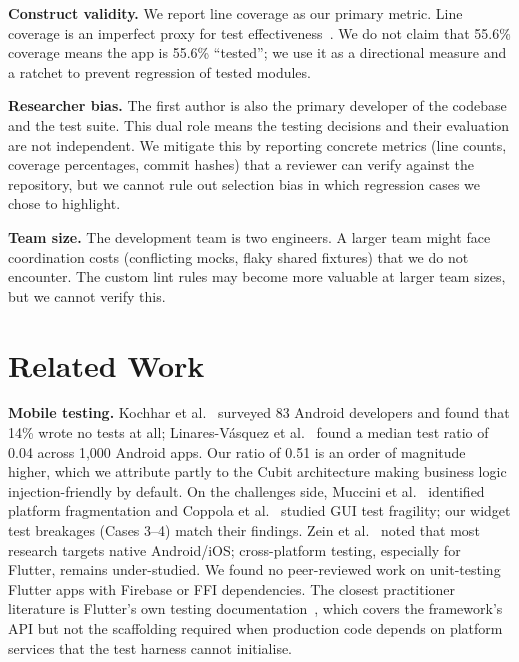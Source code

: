 \documentclass[10pt,journal,compsoc]{IEEEtran}
\begin{document}
\textbf{Construct validity.} We report line coverage as our primary
metric. Line coverage is an imperfect proxy for test
effectiveness~\cite{inozemtseva2014coverage,gopinath2014code}. We do not
claim that 55.6\% coverage means the app is 55.6\% ``tested''; we use it
as a directional measure and a ratchet to prevent regression of tested
modules.

\textbf{Researcher bias.} The first author is also the primary developer
of the codebase and the test suite. This dual role means the testing
decisions and their evaluation are not independent. We mitigate this by
reporting concrete metrics (line counts, coverage percentages, commit
hashes) that a reviewer can verify against the repository, but we cannot
rule out selection bias in which regression cases we chose to highlight.

\textbf{Team size.} The development team is two engineers. A larger team
might face coordination costs (conflicting mocks, flaky shared fixtures)
that we do not encounter. The custom lint rules may become more valuable
at larger team sizes, but we cannot verify this.


\section{Related Work}
\label{sec:related}

\textbf{Mobile testing.}
Kochhar et al.~\cite{kochhar2015understanding} surveyed 83 Android
developers and found that 14\% wrote no tests at all;
Linares-V\'{a}squez et al.~\cite{linares2017developers} found a median
test ratio of 0.04 across 1,000 Android apps. Our ratio of 0.51 is an
order of magnitude higher, which we attribute partly to the Cubit
architecture making business logic injection-friendly by default. On the
challenges side, Muccini et al.~\cite{muccini2012software} identified
platform fragmentation and Coppola et
al.~\cite{coppola2019mobile} studied GUI test fragility; our widget test
breakages (Cases 3--4) match their findings. Zein et
al.~\cite{zein2016systematic} noted that most research targets native
Android/iOS; cross-platform testing, especially for Flutter, remains
under-studied. We found no peer-reviewed work on unit-testing Flutter
apps with Firebase or FFI dependencies. The closest practitioner
literature is Flutter's own testing documentation~\cite{flutter_testing_docs},
which covers the framework's API but not the scaffolding required when
production code depends on platform services that the test harness
cannot initialise.
\end{document}
